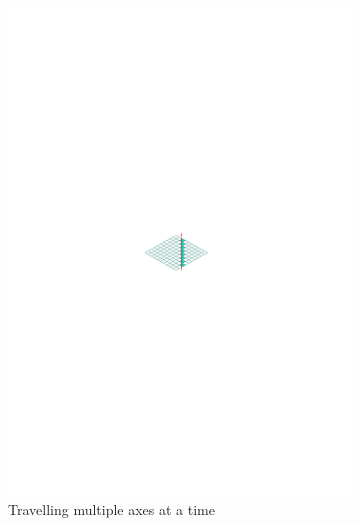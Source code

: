 \begin{figure}
\begin{subfigure}{.33\textwidth}
  \includegraphics[scale=1]{figures/dda_imprecise.pdf}
  \caption{Travelling multiple axes at a time}
  \label{fig:precision2}
\end{subfigure}
\begin{subfigure}{.33\textwidth}
  \centering

\end{subfigure}
\end{figure}
